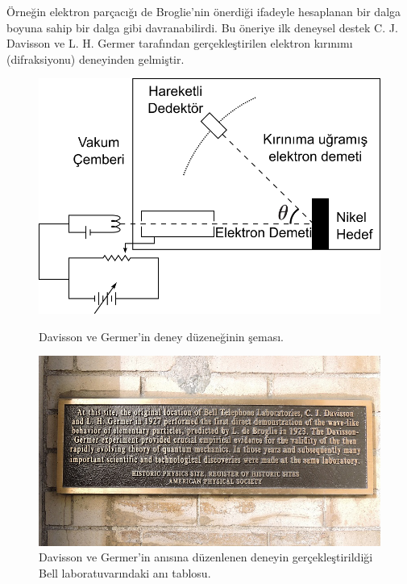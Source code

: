 \documentclass[a4paper,12pt, twoside]{article}
\begin{document}
Örneğin elektron parçacığı de Broglie'nin önerdiği ifadeyle hesaplanan bir dalga boyuna sahip bir dalga gibi davranabilirdi. Bu öneriye ilk deneysel destek C. J. Davisson ve L. H. Germer tarafından gerçekleştirilen elektron kırınımı (difraksiyonu) deneyinden gelmiştir. 

\begin{figure}[hbtp]
\center
\begin{minipage}{0.45\textwidth}
\includegraphics[scale=.7]{Davisson-Germer_experiment.png}
\caption{Davisson ve Germer'in deney düzeneğinin şeması\cite{web:wiki_davisson_germer1}.}
\label{fig:davisson_germer1}
\end{minipage}
\hspace{24pt}
\begin{minipage}{0.45\textwidth}
\includegraphics[scale=.35]{Bell_Labs_APS_plaque_west_side_of_Westbeth_door_jeh_edited.jpg}
\caption{Davisson ve Germer'in anısına düzenlenen deneyin gerçekleştirildiği Bell laboratuvarındaki anı tablosu\cite{web:wiki_davisson_germer1}.}
\label{fig:davisson_germer2}
\end{minipage}
\end{figure}
\end{document}
